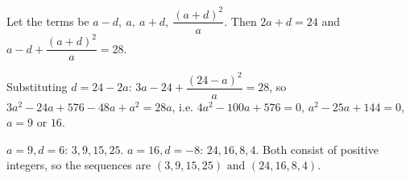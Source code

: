 Let the terms be $a-d,\ a,\ a+d,\ \dfrac{(a+d)^2}{a}$. Then $2a+d=24$ and $a-d+\dfrac{(a+d)^2}a=28$.

Substituting $d=24-2a$: $3a-24+\dfrac{(24-a)^2}{a}=28$, so $3a^2-24a+576-48a+a^2=28a$, i.e. $4a^2-100a+576=0$, $a^2-25a+144=0$, $a=9$ or $16$.

$a=9,d=6$: $3,9,15,25$. $a=16,d=-8$: $24,16,8,4$. Both consist of positive integers, so the sequences are $\boxed{(3,9,15,25)\text{ and }(24,16,8,4)}$.
